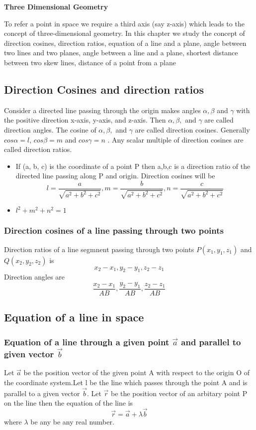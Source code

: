 \documentclass[12pt]{article}
\begin{document}
\begin{center}
    {\LARGE \textbf{Three Dimensional Geometry} }
\end{center}
To refer a point in space we require a third axis (say z-axis) which leads to the concept of three-dimensional geometry. In this chapter we study the concept of direction cosines, direction ratios, equation of a line and a plane, angle between two lines and two planes, angle between a line and a plane, shortest distance between two skew lines, distance of a point from a plane

\subsection*{Direction Cosines and direction ratios}

Consider a directed line passing through the origin makes angles $\alpha, \beta$ and $\gamma$ with the positive
direction x-axis, y-axis, and z-axis. Then $\alpha, \beta,$ and $\gamma$ are called direction angles. The cosine of $\alpha, \beta,$ and $\gamma$ are called direction cosines. Generally $cos \alpha = l$, $cos \beta = m$ and $cos \gamma = n$ . Any scalar multiple of direction cosines are called direction ratios.

\begin{itemize}
    \item If (a, b, c) is the coordinate of a point P then a,b,c is a direction ratio of the directed line passing along P and origin. Direction cosines will be $$l=\frac{a}{\sqrt{a^2+b^2+c^2}}, m=\frac{b}{\sqrt{a^2+b^2+c^2}},n=\frac{c}{\sqrt{a^2+b^2+c^2}}$$
    \item $l^2+m^2+n^2=1$ 
\end{itemize}
\subsubsection*{Direction cosines of a line passing through two points}
Direction ratios of a line segmnent passing through two points $P(x_1,y_1,z_1)$ and $Q(x_2,y_2,z_2)$  is $$x_2-x_1,y_2-y_1,z_2-z_1$$ Direction angles are $$\frac{x_2-x_1}{AB},\frac{y_2-y_1}{AB},\frac{z_2-z_1}{AB}$$

\subsection*{Equation of a line in space}

\subsubsection*{ Equation of a line through a given point $\vec{a}$ and parallel to given vector $\vec{b}$}
Let $\vec{a}$ be the position vector of the given point A with respect to the origin O of the coordinate system.Let l be the line which passes through the point A and is parallel to a given vector $\vec{b}$. Let $\vec{r}$ be the position vector of  an arbitary point P on the line then the equation of the line is $$\vec{r}=\vec{a}+\lambda \vec{b}$$ where $\lambda$ be any be any real number.
\end{document}
